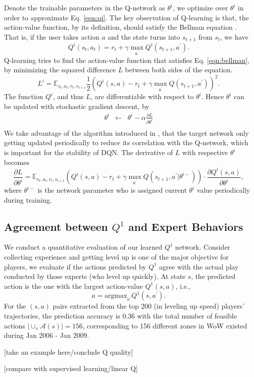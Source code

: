 \documentclass[a4paper]{article}
\begin{document}
Denote the trainable parameters in the Q-network as $\theta^i$, we optimize over $\theta^i$ in order to approximate Eq. \eqref{eqn:qi}. The key observation of Q-learning is that, the action-value function, by its definition, should satisfy the Bellman equation \cite{}. That is, if the user takes action $a$ and the state turns into $s_{t+1}$ from $s_t$, we have
$$Q^i(s_t,a_t)=r_{t} + \gamma \max_{a^\prime}Q^i(s_{t+1}, a^\prime). \label{eqn:bellman}$$
Q-learning tries to find the action-value function that satisfies Eq. \eqref{eqn:bellman}, by minimizing the squared difference $L$ between both sides of the equation.
$$L^i=\mathbb{E}_{s_t, a_t, r_t, s_{t+1}} \frac{1}{2}(Q^i(s,a)- r_{t} + \gamma\max_{a^\prime}Q(s_{t+1}, a^\prime))^2.$$
The function $Q^i$, and thus $L$, are differentiable with respect to $\theta^i$. Hence $\theta^i$ can be updated with stochastic gradient descent, by
\begin{eqnarray*}
\theta^i & \leftarrow & \theta^i - \alpha\frac{\partial L}{\partial \theta^i} \\
\end{eqnarray*}
We take advantage of the algorithm introduced in \cite{}, that the target network only getting updated periodically to reduce its correlation with the Q-network, which is important for the stability of DQN. The derivative of $L$ with respective $\theta^i$ becomes
$$\frac{\partial L}{\partial \theta^i} = \mathbb{E}_{s_t, a_t, r_t, s_{t+1}} (Q^i(s,a)- r_{t} + \gamma\max_{a^\prime}Q(s_{t+1}, a^\prime | \theta^{i -}))\cdot \frac{\partial{Q^i(s,a)}}{\partial{\theta^i}},$$
where $\theta^{i-}$ is the network parameter who is assigned current $\theta^i$ value periodically during training.

\subsection{Agreement between $Q^1$ and Expert Behaviors}

We conduct a quantitative evaluation of our learned $Q^1$ network. Consider collecting experience and getting level up is one of the major objective for players, we evaluate if the actions predicted by $Q^1$ agree with the actual play conducted by those experts (who level up quickly). At state $s$, the predicted action is the one with the largest action-value $Q^1(s,a)$, i.e.,
$$a = \text{argmax}_{a^\prime}Q^1(s,a^\prime).$$
For the $(s,a)$ pairs extracted from the top 200 (in leveling up speed) players' trajectories, the prediction accuracy is 0.36 with the total number of feasible actions $|\cup_s\mathcal{A}(s)|=156$, corresponding to 156 different zones in WoW existed during Jan 2006 - Jan 2009.

[take an example here/conclude Q quality]

[compare with supervised learning/linear Q]
\end{document}
